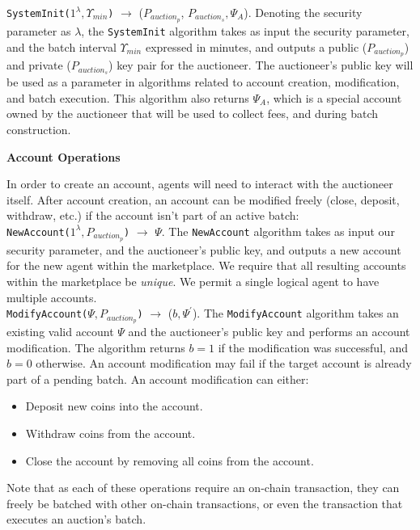 \documentclass[10pt,a4paper]{article}
\theoremstyle{definition}
\begin{document}
\texttt{SystemInit($1^{\lambda}, \Upsilon_{min}$)} $\rightarrow$ ($P_{auction_p}$,
$P_{auction_s}, \Psi_{A}$). Denoting the security parameter as $\lambda$, the
    \texttt{SystemInit} algorithm takes as input the security parameter, and
    the batch interval $\Upsilon_{min}$ expressed in minutes, and outputs a
    public ($P_{auction_p}$) and private ($P_{auction_s}$) key pair for the
    auctioneer. The auctioneer's public key will be used as a parameter in
    algorithms related to account creation, modification, and batch execution.
    This algorithm also returns $\Psi_{A}$, which is a special account owned by
    the auctioneer that will be used to collect fees, and during batch
    construction.

\begin{center}
    \textbf{Account Operations}
\end{center}

In order to create an account, agents will need to interact with the auctioneer
itself. After account creation, an account can be modified freely (close,
deposit, withdraw, etc.) if the account isn't part of an active batch: \\

\texttt{NewAccount($1^{\lambda}, P_{auction_p}$)} $\rightarrow$ $\Psi$. The
\texttt{NewAccount} algorithm takes as input our security parameter, and the
auctioneer's public key, and outputs a new account for the new agent within the
marketplace. We require that all resulting accounts within the marketplace be
\emph{unique}. We permit a single logical agent to have multiple accounts. \\

\texttt{ModifyAccount($\Psi, P_{auction_p}$)} $\rightarrow$ ($b, \Psi^\prime$).
The \texttt{ModifyAccount} algorithm takes an existing valid account $\Psi$ and
the auctioneer's public key and performs an account modification. The algorithm
returns $b=1$ if the modification was successful, and $b=0$ otherwise. An
account modification may fail if the target account is already part of a
pending batch. An account modification can either:
\begin{itemize}
    \item Deposit new coins into the account.
    \item Withdraw coins from the account.
    \item Close the account by removing all coins from the account.
\end{itemize}

Note that as each of these operations require an on-chain transaction, they can
freely be batched with other on-chain transactions, or even the transaction
that executes an auction's batch.
\end{document}
